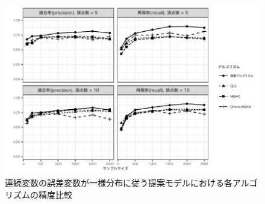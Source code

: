 \begin{figure}[H]
  \centering
  \includegraphics[width=13cm, bb=9 9 358 434]{./picture/plot_uniform.pdf}
  \caption{連続変数の誤差変数が一様分布に従う提案モデルにおける各アルゴリズムの精度比較}
  \label{fig:plot_uniform}
\end{figure}
